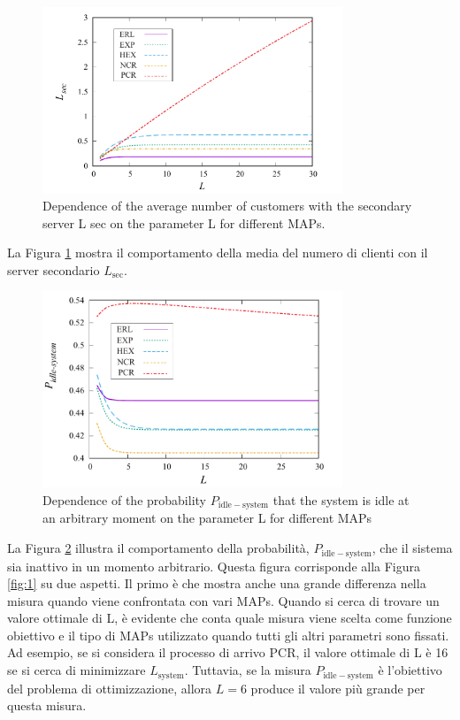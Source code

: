 \documentclass[11pt]{article}
\begin{document}
\begin{figure}[h]
    \centering
    \includegraphics[width=0.8\textwidth]{Tcjl81t.png}
    \caption{ Dependence of the average number of customers with the secondary server L sec on the
    parameter L for different MAPs.}
    \label{fig:2}
\end{figure}

\noindent La Figura \ref{fig:2} mostra il comportamento della media del numero di clienti con il server secondario $L_{\mathrm{sec}}$.

\clearpage
\begin{figure}[h]
    \centering
    \includegraphics[width=0.8\textwidth]{pSUZiNk.png}
    \caption{ Dependence of the probability $P_{\mathrm{idle-system}}$ that the system is idle at an arbitrary moment on the parameter L for different MAPs}
    \label{fig:3}
\end{figure}

La Figura \ref{fig:3} illustra il comportamento della probabilità,  $P_{\mathrm{idle-system}}$, che il sistema sia inattivo in un momento arbitrario. Questa figura corrisponde alla Figura \ref{fig:1} su due aspetti. Il primo è che mostra anche una grande differenza nella misura quando viene confrontata con vari MAPs. Quando si cerca di trovare un valore ottimale di L, è evidente che conta quale misura viene scelta come funzione obiettivo e il tipo di MAPs utilizzato quando tutti gli altri parametri sono fissati. Ad esempio, se si considera il processo di arrivo PCR, il valore ottimale di L è 16 se si cerca di minimizzare $L_{\mathrm{system}}$. Tuttavia, se la misura  $P_{\mathrm{idle-system}}$ è l'obiettivo del problema di ottimizzazione, allora $L = $6 produce il valore più grande per questa misura. \vspace{0.4cm}
\end{document}
